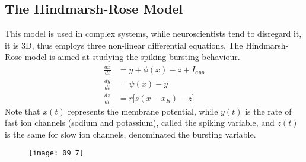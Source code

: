 \subsection{The Hindmarsh-Rose Model}
This model is used in complex systems, while neuroscientists tend to disregard it, it is 3D, thus employs
three non-linear differential equations. The Hindmarsh-Rose model is aimed at studying the spiking-bursting
behaviour.
\begin{align*}
    \frac{dx}{dt} & =y+\phi{(x)}-z+I_{app}     \\
    \frac{dy}{dt} & =\psi{(x)}-y               \\
    \frac{dz}{dt} & =r\bigl[s(x-x_{R})-z\bigr]
\end{align*}
Note that \(x(t)\) represents the membrane potential, while \(y(t)\) is the rate of fast ion channels
(sodium and potassium), called the spiking variable, and \(z(t)\) is the same for slow ion channels,
denominated the bursting variable.
\begin{figure}[H]
    \texttt{[image: 09\_7]}
    \centering
\end{figure}